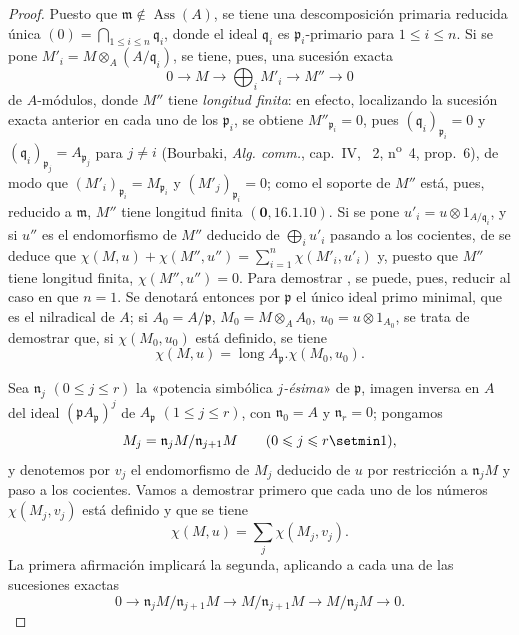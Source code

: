\begin{proof}
Puesto que $\mathfrak{m}\notin\operatorname{Ass}(A)$, se tiene una descomposición primaria reducida única $(0)=\bigcap_{1\leq i\leq n}\mathfrak{q}_i$, donde el ideal $\mathfrak{q}_i$ es $\mathfrak{p}_i$-primario para $1\leq i\leq n$.
Si se pone $M'_i=M\otimes_A(A/\mathfrak{q}_i)$, se tiene, pues, una sucesión exacta
\[
  0\to M\to\bigoplus_iM'_i\to M''\to0
\]
de $A$-módulos, donde $M''$ tiene \emph{longitud finita}:
en efecto, localizando la sucesión exacta anterior en cada uno de los $\mathfrak{p}_i$, se obtiene $M''_{\mathfrak{p}_i}=0$, pues $(\mathfrak{q}_i)_{\mathfrak{p}_i}=0$ y $(\mathfrak{q}_i)_{\mathfrak{p}_j}=A_{\mathfrak{p}_j}$ para $j\neq i$ (Bourbaki, \emph{Alg. comm.}, cap.~IV, \textsection~2, n\textsuperscript{o}~4, prop.~6), de modo que $(M'_i)_{\mathfrak{p}_i}=M_{\mathfrak{p}_i}$ y $(M'_j)_{\mathfrak{p}_i}=0$;
como el soporte de $M''$ está, pues, reducido a $\mathfrak{m}$, $M''$ tiene longitud finita $(\mathbf{0},16.1.10)$.
Si se pone $u'_i=u\otimes1_{A/\mathfrak{q}_i}$, y si $u''$ es el endomorfismo de $M''$ deducido de $\bigoplus_i u'_i$ pasando a los cocientes, de  se deduce que $\chi(M,u)+\chi(M'',u'')=\sum_{i=1}^n\chi(M'_i,u'_i)$ y, puesto que $M''$ tiene longitud finita, $\chi(M'',u'')=0$.
Para demostrar , se puede, pues, reducir al caso en que $n=1$.
Se denotará entonces por $\mathfrak{p}$ el único ideal primo minimal, que es el nilradical de $A$;
si $A_0=A/\mathfrak{p}$, $M_0=M\otimes_AA_0$, $u_0=u\otimes1_{A_0}$, se trata de demostrar que, si $\chi(M_0,u_0)$ está definido, se tiene
\[
\label{IV.21.10.17.9}
  \chi(M,u)=\operatorname{long}A_{\mathfrak{p}}.\chi(M_0,u_0).
  \tag{21.10.17.9}
\]

Sea $\mathfrak{n}_j$ $(0\leq j\leq r)$ la «potencia simbólica \emph{$j$-ésima}» de $\mathfrak{p}$, imagen inversa en $A$ del ideal $(\mathfrak{p}A_{\mathfrak{p}})^j$ de $A_{\mathfrak{p}}$ $(1\leq j\leq r)$, con $\mathfrak{n}_0=A$ y $\mathfrak{n}_r=0$;
pongamos
\[
  M_j=\mathfrak{n}_jM/\mathfrak{n}_{j+1}M\qquad(0\leq j\leq r\setmin 1),
\]
y denotemos por $v_j$ el endomorfismo de $M_j$ deducido de $u$ por restricción a $\mathfrak{n}_jM$ y paso a los cocientes.
Vamos a demostrar primero que cada uno de los números $\chi(M_j,v_j)$ está definido y que se tiene
\[
\label{IV.21.10.17.10}
  \chi(M,u)=\sum_j\chi(M_j,v_j).
  \tag{21.10.17.10}
\]
La primera afirmación implicará la segunda, aplicando  a cada una de las sucesiones exactas
\[
  0\to\mathfrak{n}_jM/\mathfrak{n}_{j+1}M\to M/\mathfrak{n}_{j+1}M\to M/\mathfrak{n}_jM\to0.
\]


\end{proof}
